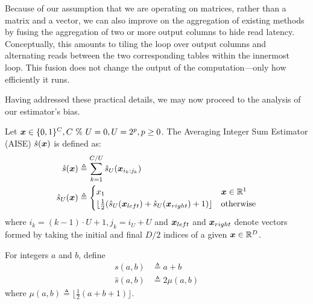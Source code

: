 Because of our assumption that we are operating on matrices, rather than a matrix and a vector, we can also improve on the aggregation of existing methods \cite{bolt, quickAdc, quickerAdc} by fusing the aggregation of two or more output columns to hide read latency. Conceptually, this amounts to tiling the loop over output columns and alternating reads between the two corresponding tables within the innermost loop. This fusion does not change the output of the computation---only how efficiently it runs.

Having addressed these practical details, we may now proceed to the analysis of our estimator's bias.

\begin{definition}
Let $\bm{x} \in \{0, 1\}^C, C \text{ \% } U = 0, U = 2^p, p \ge 0$. The Averaging Integer Sum Estimator (AISE) $\hat{s}(\bm{x})$ is defined as:
\begin{align}
    \hat{s}(\bm{x}) &\triangleq \sum_{k=1}^{C / U} \hat{s}_U(\bm{x}_{i_k:j_k}) \\
    \hat{s}_U(\bm{x}) &\triangleq
        \begin{cases}
            x_1 & \bm{x} \in \mathbb{R}^1 \\
             \lfloor \frac{1}{2}(\hat{s}_U(\bm{x}_{left}) + \hat{s}_U(\bm{x}_{right}) + 1) \rfloor & \text{otherwise}
       \end{cases}
\end{align}
where $i_k = (k-1) \cdot U+1, j_k = i_U + U$ and $\bm{x}_{left}$ and $\bm{x}_{right}$ denote vectors formed by taking the initial and final $D/2$ indices of a given $\bm{x} \in \mathbb{R}^D$.
\end{definition}

\begin{definition}
For integers $a$ and $b$, define
\begin{align}
    s(a, b) &\triangleq a + b \\
    \hat{s}(a, b) &\triangleq 2 \mu(a, b)
\end{align}
where $\mu(a, b) \triangleq \lfloor \frac{1}{2}(a + b + 1) \rfloor$.
\end{definition}

